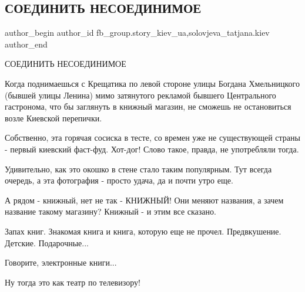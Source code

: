  
 
 
 
 
 
\subsection{СОЕДИНИТЬ НЕСОЕДИНИМОЕ}
\label{sec:11_02_2022.fb.fb_group.story_kiev_ua.1.soedinit_nesoedinimoe}
 
\ifcmt
 author_begin
   author_id fb_group.story_kiev_ua,solovjeva_tatjana.kiev
 author_end
\fi

СОЕДИНИТЬ НЕСОЕДИНИМОЕ

Когда поднимаешься с  Крещатика по левой стороне улицы Богдана Хмельницкого
(бывшей улицы Ленина) мимо затянутого рекламой бывшего Центрального гастронома,
что бы заглянуть в книжный магазин, не сможешь не остановиться возле Киевской
перепички. 


Собственно, эта горячая сосиска в тесте, со времен уже не существующей страны -
первый киевский фаст-фуд. Хот-дог! Слово такое, правда, не употребляли тогда. 

Удивительно, как это окошко в стене стало таким популярным. Тут всегда очередь,
а эта фотография - просто удача, да и почти утро еще.


А рядом - книжный, нет не так - КНИЖНЫЙ! Они меняют названия, а зачем название
такому магазину? Книжный - и этим все сказано. 

Запах книг. Знакомая книга и книга, которую еще не прочел. Предвкушение.
Детские. Подарочные...

Говорите, электронные книги...

Ну тогда это как театр по телевизору!

